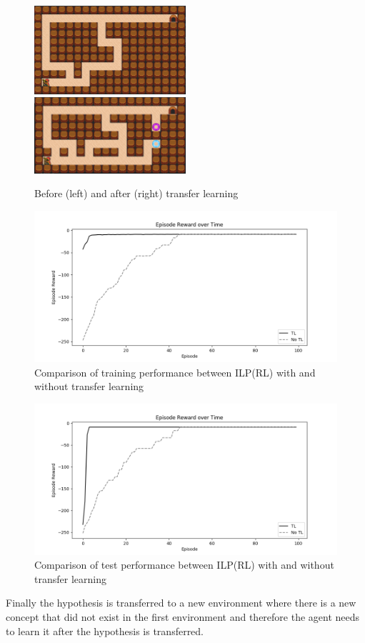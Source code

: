 \begin{figure}[!htb]
\centerline{
\includegraphics[width=0.5\textwidth]{./figures/experiment4_before}
\includegraphics[width=0.5\textwidth]{./figures/experiment5_after}
}
\caption{Before (left) and after (right) transfer learning}
\label{experiment5}
\end{figure}

\begin{figure}[!htb]
\centering
\includegraphics[width=1.0\textwidth]{./figures/experiment4_after_training}
\caption{Comparison of training performance between ILP(RL) with and without transfer learning}
\label{experiment3_training}
\end{figure}

\begin{figure}[!htb]
\centering
\includegraphics[width=1.0\textwidth]{./figures/experiment4_after_test}
\caption{Comparison of test performance between ILP(RL) with and without transfer learning}
\label{experiment3_test}
\end{figure}
    

Finally the hypothesis is transferred to a new environment where there is a new concept that did not exist in the first environment
and therefore the agent needs to learn it after the hypothesis is transferred.
